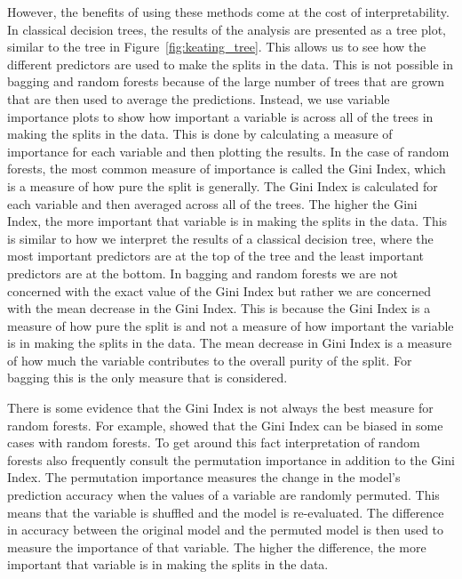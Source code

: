 However, the benefits of using these methods come at the cost of interpretability. In classical decision trees, the results of the analysis are presented as a tree plot, similar to the tree in Figure~\ref{fig:keating_tree}. This allows us to see how the different predictors are used to make the splits in the data. This is not possible in bagging and random forests because of the large number of trees that are grown that are then used to average the predictions. Instead, we use variable importance plots to show how important a variable is across all of the trees in making the splits in the data. This is done by calculating a measure of importance for each variable and then plotting the results. In the case of random forests, the most common measure of importance is called the Gini Index, which is a measure of how pure the split is generally. The Gini Index is calculated for each variable and then averaged across all of the trees. The higher the Gini Index, the more important that variable is in making the splits in the data. This is similar to how we interpret the results of a classical decision tree, where the most important predictors are at the top of the tree and the least important predictors are at the bottom. In bagging and random forests we are not concerned with the exact value of the Gini Index but rather we are concerned with the mean decrease in the Gini Index. This is because the Gini Index is a measure of how pure the split is and not a measure of how important the variable is in making the splits in the data. The mean decrease in Gini Index is a measure of how much the variable contributes to the overall purity of the split. For bagging this is the only measure that is considered. 

There is some evidence that the Gini Index is not always the best measure for random forests. For example, \citet{stroblBiasRandomForest2007} showed that the Gini Index can be biased in some cases with random forests. To get around this fact interpretation of random forests also frequently consult the permutation importance in addition to the Gini Index. The permutation importance measures the change in the model's prediction accuracy when the values of a variable are randomly permuted. This means that the variable is shuffled and the model is re-evaluated. The difference in accuracy between the original model and the permuted model is then used to measure the importance of that variable. The higher the difference, the more important that variable is in making the splits in the data.

